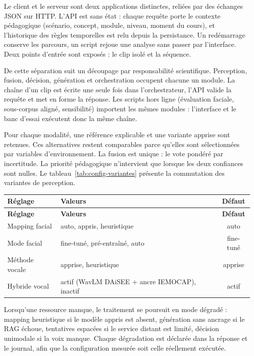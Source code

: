Le client et le serveur sont deux applications distinctes, reliées
par des échanges JSON sur HTTP. L'API est sans état : chaque requête
porte le contexte pédagogique (scénario, concept, module, niveau,
moment du cours), et l'historique des règles temporelles est relu
depuis la persistance. Un redémarrage conserve les parcours, un
script rejoue une analyse sans passer par l'interface. Deux points
d'entrée sont exposés : le clip isolé et la séquence.

De cette séparation suit un découpage par responsabilité
scientifique. Perception, fusion, décision, génération et
orchestration occupent chacune un module.
La chaîne d'un clip est écrite une seule fois dans l'orchestrateur, 
l'API valide la requête et met en forme la réponse. Les scripts hors
ligne (évaluation faciale, sous-corpus aligné, sensibilité)
importent les mêmes modules : l'interface et le banc d'essai
exécutent donc la même chaîne.

Pour chaque modalité, une référence explicable et une variante
apprise sont retenues. Ces alternatives
restent comparables parce qu'elles sont sélectionnées par variables
d'environnement. La fusion est unique : le vote pondéré par
incertitude. La priorité pédagogique n'intervient que lorsque les
deux confiances sont nulles.
Le tableau~\ref{tab:config-variantes} présente la commutation des
variantes de perception.

{\small
\renewcommand{\arraystretch}{1.18}
\setlength{\tabcolsep}{4pt}
\begin{xltabular}{\textwidth}{|>{\raggedright\arraybackslash}X|>{\raggedright\arraybackslash}X|c|}
\hline
{}
\textbf{Réglage} & \textbf{Valeurs} & \textbf{Défaut} \\
\hline
\endfirsthead
\hline
{}
\textbf{Réglage} & \textbf{Valeurs} & \textbf{Défaut} \\
\hline
\endhead
\endfoot
\endlastfoot
Mapping facial & auto, appris, heuristique & auto \\
\hline
Mode facial & fine-tuné, pré-entraîné, auto & fine-tuné \\
\hline
Méthode vocale & apprise, heuristique & apprise \\
\hline
Hybride vocal & actif (WavLM DAiSEE + ancre IEMOCAP), inactif & actif \\
\hline
\end{xltabular}
\label{tab:config-variantes}
} 

Lorsqu'une ressource manque, le traitement se poursuit en mode
dégradé : mapping heuristique si le modèle appris est absent,
génération sans ancrage si le RAG échoue, tentatives espacées si le
service distant est limité, décision unimodale si la voix manque.
Chaque dégradation est déclarée dans la réponse et le journal, afin
que la configuration mesurée soit celle réellement exécutée.

